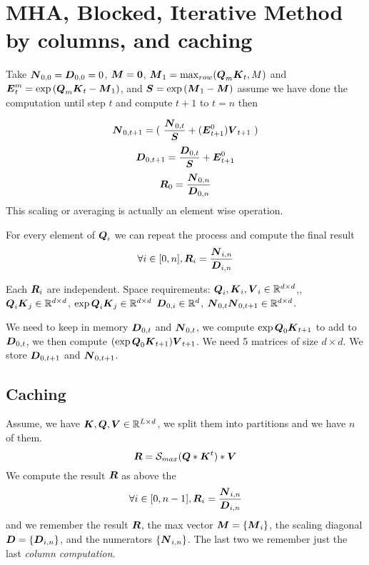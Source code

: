 \documentclass[conference]{IEEEtran}
\begin{document}
\newpage

\section{MHA, Blocked, Iterative Method by columns, and caching}
\label{sec:iterative}

Take ${\boldsymbol N}_{0,0}= {\boldsymbol D}_{0,0}=0$, ${\boldsymbol M} = {\boldsymbol 0}$, ${\boldsymbol M}_1 =
\max_{row} ({\boldsymbol Q}_m{\boldsymbol K}_{t}, M)$ and
${\boldsymbol E}_t^m=\exp{({\boldsymbol Q}_m{\boldsymbol K}_{t}-{\boldsymbol M}_1)}$, and ${\boldsymbol S}
=\exp{({\boldsymbol M}_1 - {\boldsymbol M})}$ assume we have done the computation until
step $t$ and compute $t+1$ to $t=n$ then

\begin{equation}
  \label{eq:sum0}
  \Vc{N}_{0,t+1} =(\
  \frac{\Vc{N}_{0,t}}{\Vc{S}}  + (\Vc{E}_{t+1}^0)\Vc{V}_{t+1}\
  )
\end{equation}
\begin{equation}
    \label{eq:sum1}
  {\Vc{D}_{0,t+1}} = {\frac{\Vc{D}_{0,t}}{\Vc{S}} +\Vc{E}_{t+1}^0}
\end{equation}
\begin{equation}
  \label{eq:res}
  \Vc{R}_0 = \frac{\Vc{N}_{0,n}}{\Vc{D}_{0,n}}
\end{equation}
This scaling or averaging is actually an element wise operation.

For every element of ${\boldsymbol Q}_i$ we can repeat the process and compute the final result
\begin{equation}
  \label{eq:resall}
 \forall i \in [0,n],\/ \Vc{R}_i = \frac{\Vc{N}_{i,n}}{\Vc{D}_{i,n}}
\end{equation}

Each ${\boldsymbol R}_i$ are independent.  Space requirements: ${\boldsymbol Q}_i,
{\boldsymbol K}_i, {\boldsymbol V}_i \in \mathbb{R}^{d \times d}$,, ${\boldsymbol Q}_i{\boldsymbol K}_j \in
\mathbb{R}^{d\times d}$, $\exp{\boldsymbol Q}_i{\boldsymbol K}_j \in \mathbb{R}^{d\times d}$
${\boldsymbol D}_{0,i} \in \mathbb{R}^{d}$, ${\boldsymbol N}_{0,t}{\boldsymbol N}_{0,t+1} \in \mathbb{R}^{d
  \times d}$.

We need to keep in memory ${\boldsymbol D}_{0,t}$ and ${\boldsymbol N}_{0,t}$, we
compute $\exp{{\boldsymbol Q}_0{\boldsymbol K}_{t+1}}$ to add to ${\boldsymbol D}_{0,t}$, we then
compute $(\exp{{\boldsymbol Q}_0{\boldsymbol K}_{t+1}}){\boldsymbol V}_{t+1}$. We need 5 matrices
of size $d \times d$. We store  ${\boldsymbol D}_{0,t+1}$ and ${\boldsymbol N}_{0,t+1}$.


\subsection{Caching}
Assume, we have ${\boldsymbol K},{\boldsymbol Q},{\boldsymbol V} \in \mathbb{R} ^{L\times d}$, we split
them into partitions and we have $n$ of them.
\begin{equation}
  \Vc{R} = \Smax{\Vc{Q}*\Vc{K}^t}*\Vc{V}
\end{equation}
We compute the result ${\boldsymbol R}$ as above the
\begin{equation}
  \label{eq:resall}
 \forall i \in [0,n-1],\/ \Vc{R}_i = \frac{\Vc{N}_{i,n}}{\Vc{D}_{i,n}}
\end{equation}
and we remember the result ${\boldsymbol R}$, the max vector ${\boldsymbol M} =
\{{\boldsymbol M}_i\}$, the scaling diagonal $ {\boldsymbol D} = \{ {\boldsymbol D}_{i,n} \}$,
and the numerators $\{{\boldsymbol N}_{i,n}\}$. The last two we remember just
the last {\em column computation}.
\end{document}
